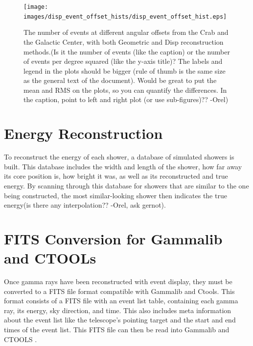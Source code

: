     \begin{figure}[ht]
      \begin{center}
        \texttt{[image: images/disp\_event\_offset\_hists/disp\_event\_offset\_hist.eps]}
        \caption[DISP Offset Improvement]{The number of events at different angular offsets from the Crab and the Galactic Center, with both Geometric and Disp reconstruction methods.(Is it the number of events (like the caption) or the number of events per degree squared (like the y-axis title)? 
    The labels and legend in the plots should be bigger (rule of thumb is the same size as the general text of the document). 
    Would be great to put the mean and RMS on the plots, so you can quantify the differences.
    In the caption, point to left and right plot (or use sub-figures)?? -Orel)}\label{fig:disp_event_offset}
      \end{center}
    \end{figure}

\section{Energy Reconstruction}\label{subsec:enrecon}
  To reconstruct the energy of each shower, a database of simulated showers is built.
  This database includes the width and length of the shower, how far away its core position is, how bright it was, as well as its reconstructed and true energy.
  By scanning through this database for showers that are similar to the one being constructed, the most similar-looking shower then indicates the true energy(is there any interpolation?? -Orel, ask gernot).

\section{FITS Conversion for Gammalib and CTOOLs}
  Once gamma rays have been reconstructed with event display, they must be converted to a FITS file format compatible with Gammalib and Ctools.
  This format consists of a FITS file with an event list table, containing each gamma ray, its energy, sky direction, and time.
  This also includes meta information about the event list like the telescope's pointing target and the start and end times of the event list.
  This FITS file can then be read into Gammalib and CTOOLS \cite{gammalibctools}.

